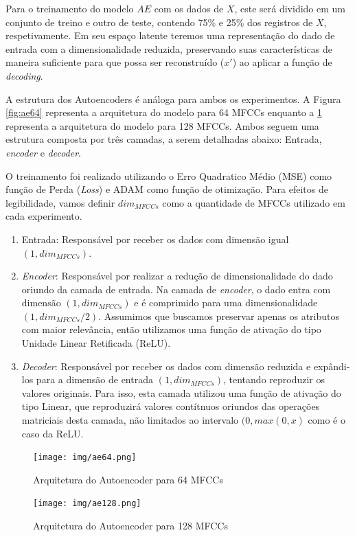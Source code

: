 Para o treinamento do modelo $AE$ com os dados de $X$, este será dividido em um conjunto de treino e outro de teste, contendo 75\% e 25\% dos registros de $X$, respetivamente. Em seu espaço latente teremos uma representação do dado de entrada com a dimensionalidade reduzida, preservando suas características de maneira suficiente para que possa ser reconstruído ($x'$) ao aplicar a função de \textit{decoding}.

A estrutura dos Autoencoders é análoga para ambos os experimentos. A Figura \ref{fig:ae64} representa a arquitetura do modelo para 64 \acrshort{MFCC}s enquanto a \ref{fig:ae128} representa a arquitetura do modelo para 128 \acrshort{MFCC}s. Ambos seguem uma estrutura composta por três camadas, a serem detalhadas abaixo: Entrada, \textit{encoder} e \textit{decoder}.

O treinamento foi realizado utilizando o Erro Quadratico Médio (\acrshort{MSE}) como função de Perda (\textit{Loss}) e \acrshort{ADAM} como função de otimização. Para efeitos de legibilidade, vamos definir $dim_{MFCCs}$ como a quantidade de \acrshort{MFCC}s utilizado em cada experimento.

\begin{enumerate}
    \item Entrada: Responsável por receber os dados com dimensão igual $(1, dim_{MFCCs})$.
    \item \textit{Encoder}: Responsável por realizar a redução de dimensionalidade do dado oriundo da camada de entrada. Na camada de \textit{encoder}, o dado entra com dimensão $(1, dim_{MFCCs})$ e é comprimido para uma dimensionalidade $(1, dim_{MFCCs}/2)$. Assumimos que buscamos preservar apenas os atributos com maior relevância, então utilizamos uma função de ativação do tipo Unidade Linear Retificada (\acrshort{ReLU}).
    \item \textit{Decoder}: Responsável por receber os dados com dimensão reduzida e expândi-los para a dimensão de entrada $(1, dim_{MFCCs})$, tentando reproduzir os valores originais. Para isso, esta camada utilizou uma função de ativação do tipo Linear, que reproduzirá valores contítnuos oriundos das operações matriciais desta camada, não limitados ao intervalo $(0, max(0, x)$ como é o caso da \acrshort{ReLU}.
\end{enumerate}

\begin{figure}[h]
    \centering
    \begin{minipage}[b]{0.4\linewidth}
        \centering
        \texttt{[image: img/ae64.png]}
        \caption{\label{fig:ae64}Arquitetura do Autoencoder para 64 \acrshort{MFCC}s}
    \end{minipage}
    \begin{minipage}[b]{0.4\linewidth}
        \centering
        \texttt{[image: img/ae128.png]}
        \caption{\label{fig:ae128}Arquitetura do Autoencoder para 128 \acrshort{MFCC}s}
    \end{minipage}
\end{figure}


